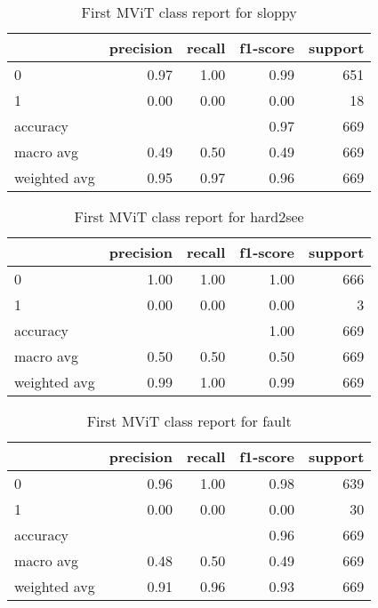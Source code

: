 \begin{table}[h!]
    \begin{tabular}{|l|r|r|r|r|}
                \hline & precision &   recall & f1-score &  support \\ \hline
                0 &      0.97 &     1.00 &     0.99 &      651 \\
                1 &      0.00 &     0.00 &     0.00 &       18 \\
         accuracy &           &          &     0.97 &      669 \\ \hline
        macro avg &      0.49 &     0.50 &     0.49 &      669 \\
     weighted avg &      0.95 &     0.97 &     0.96 &      669 \\
         \hline
    \end{tabular}
    \caption[Sloppy class report]{First MViT class report for sloppy}
    \label{tbl:mvit-first-class-reports-sloppy}
\end{table}

\begin{table}[h!]
    \begin{tabular}{|l|r|r|r|r|}
                \hline & precision &   recall & f1-score &  support \\ \hline
                0 &      1.00 &     1.00 &     1.00 &      666 \\
                1 &      0.00 &     0.00 &     0.00 &        3 \\ \hline
         accuracy &           &          &     1.00 &      669 \\
        macro avg &      0.50 &     0.50 &     0.50 &      669 \\
     weighted avg &      0.99 &     1.00 &     0.99 &      669 \\

         \hline
    \end{tabular}
    \caption[Hard to see class report]{First MViT class report for hard2see}
    \label{tbl:mvit-first-class-reports-hard2see}
\end{table}

\begin{table}[h!]
    \begin{tabular}{|l|r|r|r|r|}
                \hline & precision &   recall & f1-score &  support \\ \hline
                0 &      0.96 &     1.00 &      0.98 &       639 \\
                1 &      0.00 &     0.00 &      0.00 &        30 \\ \hline
         accuracy &           &          &      0.96 &       669 \\
        macro avg &      0.48 &     0.50 &      0.49 &       669 \\
     weighted avg &      0.91 &     0.96 &      0.93 &       669 \\
         \hline
    \end{tabular}
    \caption[Fault class report]{First MViT class report for fault}
    \label{tbl:mvit-first-class-reports-fault}
\end{table}
